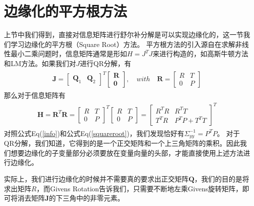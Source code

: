\documentclass[a4pape,oneside,10pt]{article}
\begin{document}
\section{边缘化的平方根方法}
上节中我们得到，直接对信息矩阵进行舒尔补分解是可以实现边缘化的，这一节我们学习边缘化的平方根（Square Root）方法。
平方根方法的引入源自在求解非线性最小二乘问题时，信息矩阵通常是形如$H=J^TJ$来进行构造的，如高斯牛顿方法和LM方法。如果我们对$J$进行QR分解，有
\begin{equation}
    \label{qr}
    \begin{split}
    \begin{aligned}
        \textbf{J} = \begin{bmatrix}
            \textbf{Q}_1 & \textbf{Q}_2
        \end{bmatrix} ^T
        \begin{bmatrix}
            \textbf{R} \\ \textbf{0}
        \end{bmatrix},  
        \quad with \quad \textbf{R} = \begin{bmatrix}
            R & T \\
            0 & P
        \end{bmatrix}
    \end{aligned}
    \end{split}
    \end{equation}
那么对于信息矩阵有
\begin{equation}
    \label{squareroot}
    \begin{split}
    \begin{aligned}
        \textbf{H} = \textbf{R}^T\textbf{R} = 
        \begin{bmatrix}
            R & T \\
            0 & P
        \end{bmatrix} ^T
        \begin{bmatrix}
            R & T \\
            0 & P
        \end{bmatrix}
        =
        \begin{bmatrix}
            R^TR & R^TT \\
            T^TR & P^TP + T^TT
        \end{bmatrix} ^T
    \end{aligned}
    \end{split}
\end{equation}
对照公式Eq(\ref{info})和公式Eq(\ref{squareroot})，我们发现恰好有$\Sigma_{yy}^{-1} = P^TP$。
对于QR分解，我们知道，它得到的是一个正交矩阵和一个上三角矩阵的乘积。因此我们想要边缘化的子变量部分必须要放在变量向量的头部，才能直接使用上述方法进行边缘化。

实际上，我们进行边缘化的时候并不需要真的要求出正交矩阵$\textbf{Q}$，我们的目的是将求出矩阵$R$，而Givens Rotation告诉我们，只需要不断地左乘Givens旋转矩阵，即可将消去矩阵$\textbf{J}$的下三角中的非零元素。

\begin{thebibliography}{99}
    \end{thebibliography} 
\end{document}
